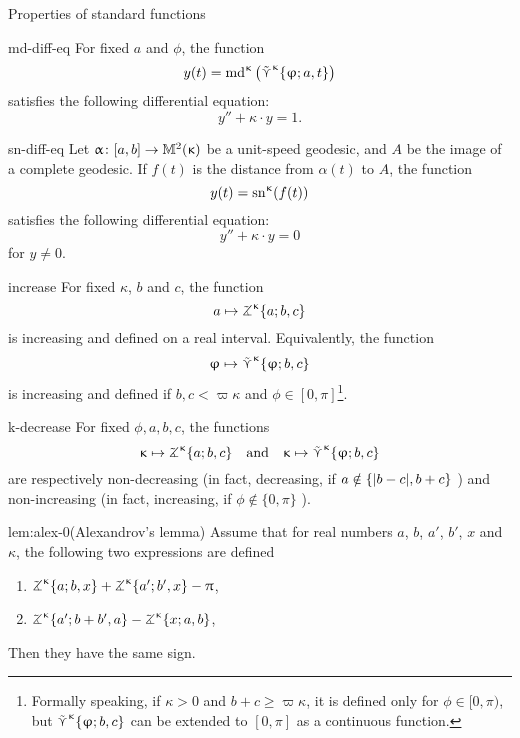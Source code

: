 \begin{thm}{Properties of standard functions}\label{md-equalities}

\begin{subthm}{md-diff-eq}
For fixed $a$ and $\phi$, the function 
\[y(t)=\mathrm{md}^{\upkappa}\left(\mathop{\tilde\curlyvee}\nolimits^{\upkappa}\{\upvarphi;a,t\}\right)\]
 satisfies the following differential equation:
\[y''+\kappa\cdot y=1.\]
\end{subthm}

\begin{subthm}{sn-diff-eq}
Let $\alpha\:[a,b]\to\Lob2\kappa$ be a unit-speed geodesic, and $A$ be the image of a complete geodesic.  If $f(t)$ is the distance from $\alpha(t)$ to $A$, the function 
\[y(t)=\mathrm{sn}^{\upkappa} (f(t))\]
 satisfies the following differential equation:
\[y''+\kappa\cdot y=0\]
for $y\ne 0$.
\end{subthm}

\begin{subthm}{increase}
For fixed $\kappa$, $b$ and $c$, the function 
\[a\mapsto\tangle\mc\kappa\{a;b,c\}\]
is increasing and defined on a real interval.
Equivalently, the function
\[\phi\mapsto\side\kappa \{\phi;b,c\}\]
is increasing and defined if $b,c<\varpi\kappa$ and $\phi\in[0,\pi]$\footnote{Formally speaking, if $\kappa>0$ and $b+c\ge \varpi\kappa$, it is defined only for $\phi\in[0,\pi)$, but $\mathop{\tilde\curlyvee}\nolimits^{\upkappa} \{\upvarphi;b,c\}$ can be extended to $[0,\pi]$ as a continuous function.}.
\end{subthm}

\begin{subthm}{k-decrease}
For fixed $\phi,a,b,c$, the functions
\[\kappa\mapsto \tangle\mc\kappa\{a;b,c\}\quad \text{and}\quad \kappa\mapsto \side\kappa \{\phi;b,c\}\]
are respectively non-decreasing (in fact, decreasing, if $a\z\notin\{|b-c|, b+c\}$%
) and non-increasing (in fact, increasing, if $\phi\notin\{0,\pi\}$ ).%
\end{subthm}

\begin{subthm}{lem:alex-0}(Alexandrov's lemma)
Assume that for real numbers $a$, $b$, $a'$, $b'$, $x$ and $\kappa$, the following two expressions are defined
\begin{enumerate}
\item $\tangle\mc\kappa\{a;b,x\}+\tangle\mc\kappa\{a';b',x\}-\pi$,
\item $\tangle\mc\kappa\{a';b+b',a\}-\tangle\mc\kappa\{x;a,b\}$,
\end{enumerate}
Then they have the same sign.
\end{subthm}
\end{thm}


